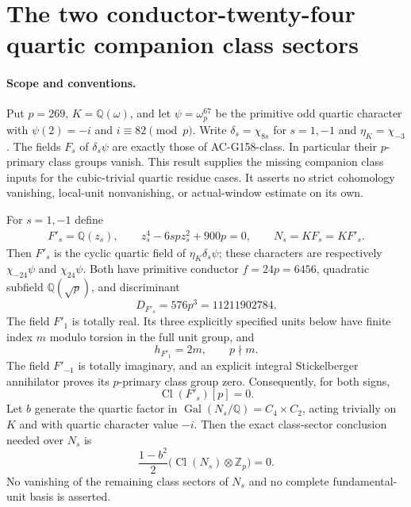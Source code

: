 \section{The two conductor-twenty-four quartic companion class sectors}
\label{sec:quadratic8-trivial-quartic-companion-classes}

\paragraph{Scope and conventions.}
Put $p=269$, $K=\mathbb Q(\omega)$, and let
$\psi=\omega_p^{67}$ be the primitive odd quartic character
with $\psi(2)=-i$ and $i\equiv82\pmod p$.
Write $\delta_s=\chi_{8s}$ for $s=1,-1$ and
$\eta_K=\chi_{-3}$.
The fields $F_s$ of $\delta_s\psi$ are exactly those of
AC-G158-class.  In particular their $p$-primary class groups vanish.
This result supplies the missing companion class inputs for the
cubic-trivial quartic residue cases.  It asserts no strict
cohomology vanishing, local-unit nonvanishing, or actual-window
estimate on its own.

\begin{theorem}
\label{AC-G164-class}
For $s=1,-1$ define
\[
 \begin{gathered}
 F'_s=\mathbb Q(z_s),\qquad
 z_s^4-6spz_s^2+900p=0,\qquad
 N_s=KF_s=KF'_s .
 \end{gathered}
 \tag{Q8TC.1}
\]
Then $F'_s$ is the cyclic quartic field of
$\eta_K\delta_s\psi$; these characters are respectively
$\chi_{-24}\psi$ and $\chi_{24}\psi$.
Both have primitive conductor $f=24p=6456$, quadratic subfield
$\mathbb Q(\sqrt p)$, and discriminant
\[
        D_{F'_s}=576p^3=11211902784.
 \tag{Q8TC.2}
\]
The field $F'_1$ is totally real.  Its three explicitly specified
units below have finite index $m$ modulo torsion in the full unit
group, and
\[
                     h_{F'_1}=2m,\qquad p\nmid m.
 \tag{Q8TC.3}
\]
The field $F'_{-1}$ is totally imaginary, and an explicit integral
Stickelberger annihilator proves its $p$-primary class group zero.
Consequently, for both signs,
\[
                      \operatorname{Cl}(F'_s)[p]=0.
 \tag{Q8TC.4}
\]
Let $b$ generate the quartic factor in
$\operatorname{Gal}(N_s/\mathbb Q)=C_4\times C_2$, acting
trivially on $K$ and with quartic character value $-i$.
Then the exact class-sector conclusion needed over $N_s$ is
\[
       \frac{1-b^2}{2}
       \bigl(\operatorname{Cl}(N_s)\otimes\mathbb Z_p\bigr)=0.
 \tag{Q8TC.5}
\]
No vanishing of the remaining class sectors of $N_s$ and no
complete fundamental-unit basis is asserted.
\end{theorem}

